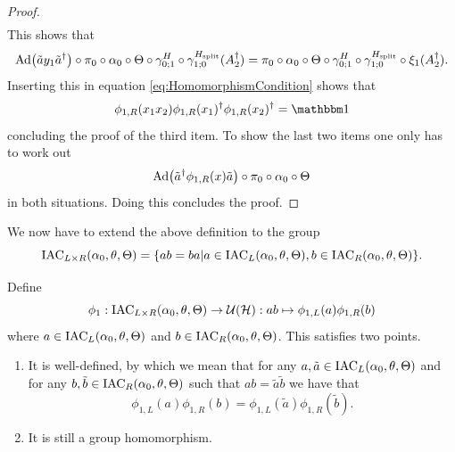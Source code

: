 \documentclass[11pt,a4paper,twoside]{article}
\numberwithin{equation}{section}
\begin{document}
\begin{proof}
\begin{align}
		\end{align}
		This shows that
		\begin{equation}
			\Ad{\tilde{a}y_1\tilde{a}^\dagger}\circ\pi_0\circ\alpha_0\circ\Theta\circ\gamma^H_{0;1}\circ\gamma^{\Hsplit}_{1;0}(A_2^\dagger)=\pi_0\circ\alpha_0\circ\Theta\circ\gamma^H_{0;1}\circ\gamma^{\Hsplit}_{1;0}\circ\xi_1(A_2^\dagger).
		\end{equation}
		Inserting this in equation \eqref{eq:HomomorphismCondition} shows that
		\begin{equation}
			\phi_{1,R}(x_1x_2)\phi_{1,R}(x_1)^\dagger\phi_{1,R}(x_2)^\dagger=\id
		\end{equation}
		concluding the proof of the third item. To show the last two items one only has to work out
		\begin{equation}
			\Ad{\tilde{a}^\dagger \phi_{1,R}(x)\tilde{a}}\circ\pi_0\circ\alpha_0\circ\Theta
		\end{equation}
		in both situations. Doing this concludes the proof.
	\end{proof}
	We now have to extend the above definition to the group
	\begin{equation}
		\textrm{IAC}_{L\times R}(\alpha_0,\theta,\Theta)=\{ab=ba|a\in\textrm{IAC}_{L}(\alpha_0,\theta,\Theta),b\in\textrm{IAC}_{R}(\alpha_0,\theta,\Theta)\}.
	\end{equation}
	\begin{lemma}\label{lem:extensionOfPhi1Definition}
		Define
		\begin{equation}
			\phi_1:\textrm{IAC}_{L\times R}(\alpha_0,\theta,\Theta)\rightarrow\mathcal U(\mathcal H):ab\mapsto \phi_{1,L}(a)\phi_{1,R}(b)
		\end{equation}
		where $a\in \textrm{IAC}_{L}(\alpha_0,\theta,\Theta)$ and $b\in \textrm{IAC}_{R}(\alpha_0,\theta,\Theta)$. This satisfies two points.
		\begin{enumerate}
			\item It is well-defined, by which we mean that for any $a,\tilde{a}\in \textrm{IAC}_{L}(\alpha_0,\theta,\Theta)$ and for any $b,\tilde{b}\in \textrm{IAC}_{R}(\alpha_0,\theta,\Theta)$ such that $ab=\tilde{a}\tilde{b}$ we have that
			\begin{equation}
				\phi_{1,L}(a)\phi_{1,R}(b)=\phi_{1,L}(\tilde a)\phi_{1,R}(\tilde b).
			\end{equation}
			\item It is still a group homomorphism.
		\end{enumerate}
	\end{lemma}
\end{document}
